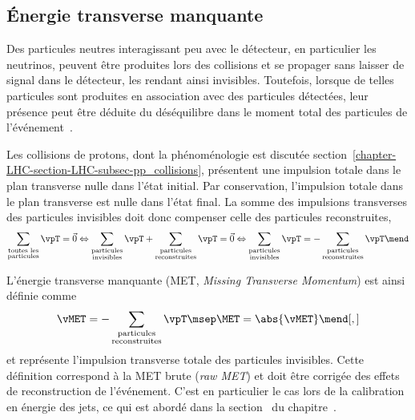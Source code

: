 \subsection{Énergie transverse manquante}\label{chapter-LHC-section-evt_reco-subsec-MET}
Des particules neutres interagissant peu avec le détecteur, en particulier les neutrinos, peuvent être produites lors des collisions et se propager sans laisser de signal dans le détecteur, les rendant ainsi invisibles.
Toutefois, lorsque de telles particules sont produites en association avec des particules détectées, leur présence peut être déduite du déséquilibre dans le moment total des particules de l'événement~\cite{CMS-PAS-JME-17-001}.
\par Les collisions de protons, dont la phénoménologie est discutée section~\ref{chapter-LHC-section-LHC-subsec-pp_collisions}, présentent une impulsion totale dans le plan transverse nulle dans l'état initial.
Par conservation, l'impulsion totale dans le plan transverse est nulle dans l'état final.
La somme des impulsions transverses des particules invisibles doit donc compenser celle des particules reconstruites, \ie
\begin{equation}
\sum_{\substack{\text{toutes les}\\\text{particules}}} \vpT = \vec{0}
\Leftrightarrow
\sum_{\substack{\text{particules}\\\text{invisibles}}} \vpT + \sum_{\substack{\text{particules}\\\text{reconstruites}}} \vpT = \vec{0}
\Leftrightarrow
\sum_{\substack{\text{particules}\\\text{invisibles}}} \vpT = -\sum_{\substack{\text{particules}\\\text{reconstruites}}} \vpT \mend
\end{equation}
\par L'énergie transverse manquante (MET, \emph{Missing Transverse Momentum}) est ainsi définie comme
\begin{equation}
\vMET = -\sum_{\substack{\text{particules}\\\text{reconstruites}}} \vpT
\msep
\MET = \abs{\vMET}
\mend[,]
\end{equation}
et représente l'impulsion transverse totale des particules invisibles.
Cette définition correspond à la MET \og brute \fg{} (\emph{raw MET}) et doit être corrigée des effets de reconstruction de l'événement.
C'est en particulier le cas lors de la calibration en énergie des jets, ce qui est abordé dans la section~ du chapitre~.
